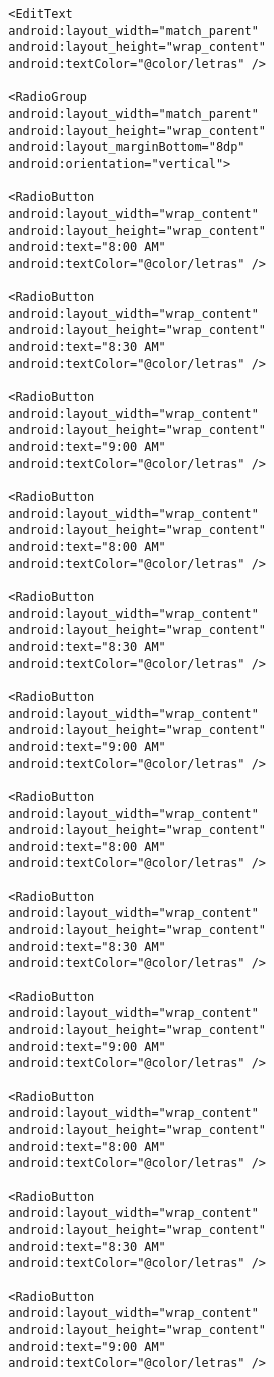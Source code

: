 \documentclass[a4paper]{article}
\begin{document}
\begin{lstlisting}
		<EditText
		android:layout_width="match_parent"
		android:layout_height="wrap_content"
		android:textColor="@color/letras" />
		
		<RadioGroup
		android:layout_width="match_parent"
		android:layout_height="wrap_content"
		android:layout_marginBottom="8dp"
		android:orientation="vertical">
		
		<RadioButton
		android:layout_width="wrap_content"
		android:layout_height="wrap_content"
		android:text="8:00 AM"
		android:textColor="@color/letras" />
		
		<RadioButton
		android:layout_width="wrap_content"
		android:layout_height="wrap_content"
		android:text="8:30 AM"
		android:textColor="@color/letras" />
		
		<RadioButton
		android:layout_width="wrap_content"
		android:layout_height="wrap_content"
		android:text="9:00 AM"
		android:textColor="@color/letras" />
		
		<RadioButton
		android:layout_width="wrap_content"
		android:layout_height="wrap_content"
		android:text="8:00 AM"
		android:textColor="@color/letras" />
		
		<RadioButton
		android:layout_width="wrap_content"
		android:layout_height="wrap_content"
		android:text="8:30 AM"
		android:textColor="@color/letras" />
		
		<RadioButton
		android:layout_width="wrap_content"
		android:layout_height="wrap_content"
		android:text="9:00 AM"
		android:textColor="@color/letras" />
		
		<RadioButton
		android:layout_width="wrap_content"
		android:layout_height="wrap_content"
		android:text="8:00 AM"
		android:textColor="@color/letras" />
		
		<RadioButton
		android:layout_width="wrap_content"
		android:layout_height="wrap_content"
		android:text="8:30 AM"
		android:textColor="@color/letras" />
		
		<RadioButton
		android:layout_width="wrap_content"
		android:layout_height="wrap_content"
		android:text="9:00 AM"
		android:textColor="@color/letras" />
		
		<RadioButton
		android:layout_width="wrap_content"
		android:layout_height="wrap_content"
		android:text="8:00 AM"
		android:textColor="@color/letras" />
		
		<RadioButton
		android:layout_width="wrap_content"
		android:layout_height="wrap_content"
		android:text="8:30 AM"
		android:textColor="@color/letras" />
		
		<RadioButton
		android:layout_width="wrap_content"
		android:layout_height="wrap_content"
		android:text="9:00 AM"
		android:textColor="@color/letras" />
		

\end{lstlisting}
\end{document}
